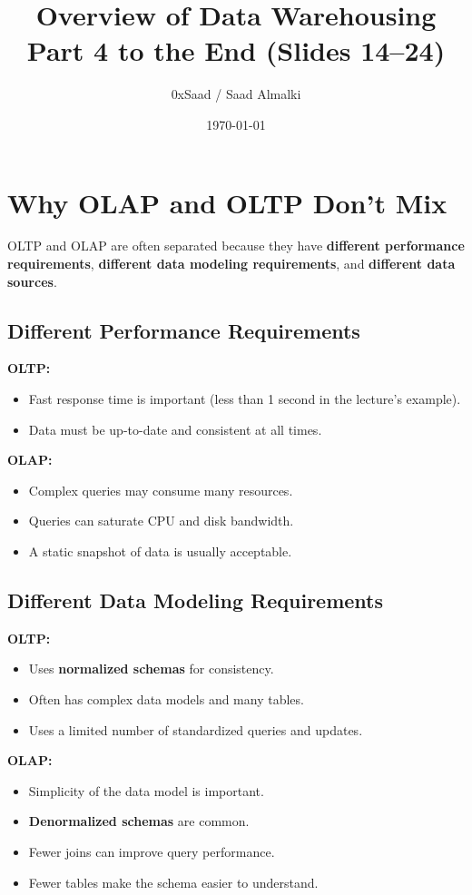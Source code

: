 \documentclass[12pt]{article}
\title{Overview of Data Warehousing\\\large Part 4 to the End (Slides 14--24)}
\author{0xSaad / Saad Almalki}
\date{\today}
\begin{document}
\maketitle

\section{Why OLAP and OLTP Don't Mix}

OLTP and OLAP are often separated because they have \textbf{different performance requirements}, \textbf{different data modeling requirements}, and \textbf{different data sources}.

\subsection{Different Performance Requirements}

\textbf{OLTP:}
\begin{itemize}
    \item Fast response time is important (less than 1 second in the lecture's example).
    \item Data must be up-to-date and consistent at all times.
\end{itemize}

\textbf{OLAP:}
\begin{itemize}
    \item Complex queries may consume many resources.
    \item Queries can saturate CPU and disk bandwidth.
    \item A static snapshot of data is usually acceptable.
\end{itemize}

\subsection{Different Data Modeling Requirements}

\textbf{OLTP:}
\begin{itemize}
    \item Uses \textbf{normalized schemas} for consistency.
    \item Often has complex data models and many tables.
    \item Uses a limited number of standardized queries and updates.
\end{itemize}
\textbf{OLAP:}
\begin{itemize}
    \item Simplicity of the data model is important.
    \item \textbf{Denormalized schemas} are common.
    \item Fewer joins can improve query performance.
    \item Fewer tables make the schema easier to understand.
\end{itemize}
\end{document}
